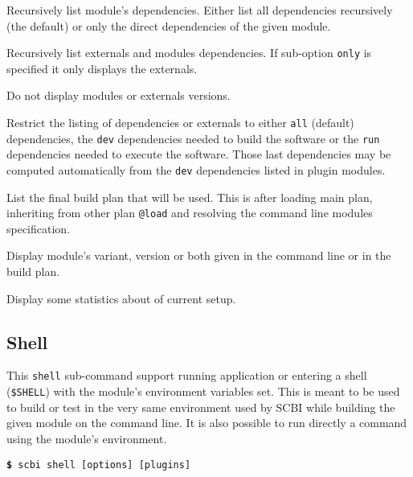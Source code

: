 \documentclass[a4paper,12pt,twoside]{article}
\newcommand{\code}[1]{\texttt{#1}}
\newcommand{\cmd}[1]{\tabto{1cm}\hspace{0.5cm}\texttt{\textbf{\$} #1}}
\newcommand{\ddash}{-{}-}
\begin{document}
\begin{description}[font=\texttt]
	\item[\ddash{}depends:{[}direct|full{]}] Recursively list module's dependencies. Either list all dependencies recursively (the default) or only the direct dependencies of the given module.

	\item[\ddash{}externals:{[}only{]}] Recursively list externals and modules dependencies. If sub-option \code{only} is specified it only displays the externals.

	\item[\ddash{}no-version] Do not display modules or externals versions.

	\item[\ddash{}filter:{[}all|run|dev{]} ] Restrict the listing of dependencies or externals to either \code{all} (default) dependencies, the \code{dev} dependencies needed to build the software or the \code{run} dependencies needed to execute the software. Those last dependencies may be computed automatically from the \code{dev} dependencies listed in plugin modules.

	\item[\ddash{}build-plan] List the final build plan that will be used. This is after loading main plan, inheriting from other plan \code{@load} and resolving the command line modules specification.

	\item[\ddash{}module-ref:{[}version|variant|full{]} ] Display module's variant, version or both given in the command line or in the build plan.

	\item[\ddash{}stat] Display some statistics about of current setup.
\end{description}

\subsection{Shell}
\label{shell}

This \code{shell} sub-command support running application or entering a shell (\code{\$SHELL}) with the module's environment variables set. This is meant to be used to build or test in the very same environment used by SCBI while building the given module on the command line. It is also possible to run directly a command using the module's environment.

\cmd{scbi shell [options] [plugins]}
\end{document}
